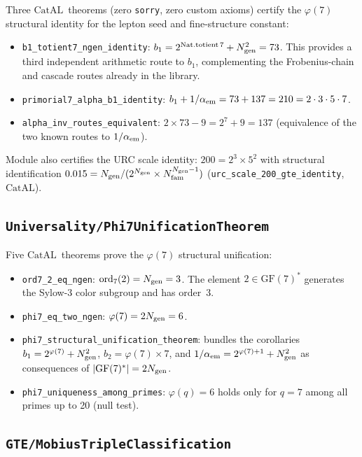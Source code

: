\documentclass[11pt,a4paper]{article}
\theoremstyle{definition}
\newcommand{\CatAL}{\ensuremath{\mathrm{CatAL}}}
\begin{document}
Three \CatAL\ theorems (zero \texttt{sorry}, zero custom axioms) certify the
$\varphi(7)$ structural identity for the lepton seed and fine-structure constant:
\begin{itemize}[nosep]
\item \lstinline|b1_totient7_ngen_identity|: $b_1 = 2^{\mathrm{Nat.totient}\,7} + N_{\rm gen}^2 = 73$.
  This provides a third independent arithmetic route to $b_1$, complementing the
  Frobenius-chain and cascade routes already in the library.
\item \lstinline|primorial7_alpha_b1_identity|: $b_1 + 1/\alpha_{\rm em} = 73 + 137 = 210 = 2\cdot3\cdot5\cdot7$.
\item \lstinline|alpha_inv_routes_equivalent|: $2\times73 - 9 = 2^7 + 9 = 137$
  (equivalence of the two known routes to $1/\alpha_{\rm em}$).
\end{itemize}
Module also certifies the URC scale identity: $200 = 2^3\times5^2$ with structural
identification $0.015 = N_{\rm gen}/(2^{N_{\rm gen}}\times N_{\rm fam}^{N_{\rm gen}-1})$
(\lstinline|urc_scale_200_gte_identity|, \CatAL).

\subsection{\texttt{Universality/Phi7UnificationTheorem}}\label{subsec:phi7-unification}

Five \CatAL\ theorems prove the $\varphi(7)$ structural unification:
\begin{itemize}[nosep]
\item \lstinline|ord7_2_eq_ngen|: $\mathrm{ord}_7(2) = N_{\rm gen} = 3$.
  The element $2 \in \mathrm{GF}(7)^*$ generates the Sylow-3 color subgroup and has order~3.
\item \lstinline|phi7_eq_two_ngen|: $\varphi(7) = 2 N_{\rm gen} = 6$.
\item \lstinline|phi7_structural_unification_theorem|: bundles the corollaries
  $b_1 = 2^{\varphi(7)}+N_{\rm gen}^2$, $b_2 = \varphi(7)\times7$, and
  $1/\alpha_{\rm em} = 2^{\varphi(7)+1}+N_{\rm gen}^2$ as consequences of
  $|\mathrm{GF}(7)^*| = 2 N_{\rm gen}$.
\item \lstinline|phi7_uniqueness_among_primes|: $\varphi(q) = 6$ holds only for
  $q = 7$ among all primes up to 20 (null test).
\end{itemize}

\subsection{\texttt{GTE/MobiusTripleClassification}}\label{subsec:mobius-triple}
\end{document}
